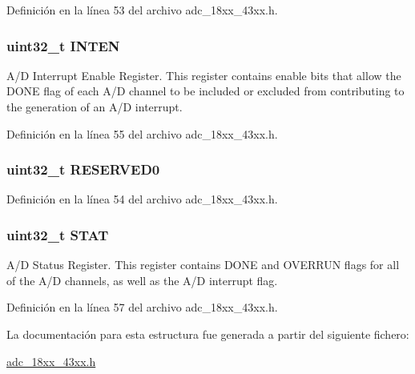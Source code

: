 Definición en la línea 53 del archivo adc\+\_\+18xx\+\_\+43xx.\+h.

\subsubsection[{\texorpdfstring{I\+N\+T\+EN}{INTEN}}]{ uint32\+\_\+t I\+N\+T\+EN}\hypertarget{struct_l_p_c___a_d_c___t_aca95f89751aed277ff796aab260401f6}{}\label{struct_l_p_c___a_d_c___t_aca95f89751aed277ff796aab260401f6}
A/D Interrupt Enable Register. This register contains enable bits that allow the D\+O\+NE flag of each A/D channel to be included or excluded from contributing to the generation of an A/D interrupt. 

Definición en la línea 55 del archivo adc\+\_\+18xx\+\_\+43xx.\+h.

\subsubsection[{\texorpdfstring{R\+E\+S\+E\+R\+V\+E\+D0}{RESERVED0}}]{ uint32\+\_\+t R\+E\+S\+E\+R\+V\+E\+D0}\hypertarget{struct_l_p_c___a_d_c___t_ad06839c5382047f4f9f2c74cc61db942}{}\label{struct_l_p_c___a_d_c___t_ad06839c5382047f4f9f2c74cc61db942}


Definición en la línea 54 del archivo adc\+\_\+18xx\+\_\+43xx.\+h.

\subsubsection[{\texorpdfstring{S\+T\+AT}{STAT}}]{ uint32\+\_\+t S\+T\+AT}\hypertarget{struct_l_p_c___a_d_c___t_a9d37b00631f37ab3e4a127a7fee46da7}{}\label{struct_l_p_c___a_d_c___t_a9d37b00631f37ab3e4a127a7fee46da7}
A/D Status Register. This register contains D\+O\+NE and O\+V\+E\+R\+R\+UN flags for all of the A/D channels, as well as the A/D interrupt flag. 

Definición en la línea 57 del archivo adc\+\_\+18xx\+\_\+43xx.\+h.



La documentación para esta estructura fue generada a partir del siguiente fichero\+:\begin{DoxyCompactItemize}
\item 
\hyperlink{adc__18xx__43xx_8h}{adc\+\_\+18xx\+\_\+43xx.\+h}\end{DoxyCompactItemize}
